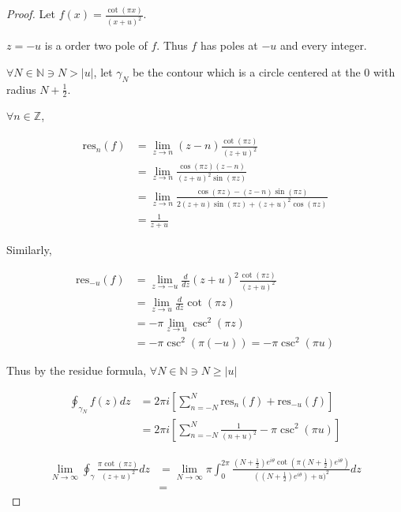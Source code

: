 \documentclass{article}
\newcommand{\Z}{\mathbb{Z}}
\newcommand{\N}{\mathbb{N}}
\begin{document}
\begin{proof}
    Let $f(x) = \frac{\cot(\pi x)}{(x + u)^2}$.
    
    $z = -u$ is a order two pole of $f$. Thus $f$ has poles at $-u$ and every integer.
    
    
    $\forall N \in \N \ni N > |u|$, let $\gamma_N$ be the contour which is a circle centered at the $0$ with radius $N + \frac{1}{2}$.    
    

    $\forall n \in \Z$, 

    \begin{align*}
        \text{res}_{n}(f) &= \lim_{z \to n} (z - n) \frac{\cot(\pi z)}{(z + u)^2} \\
        &= \lim_{z \to n} \frac{\cos(\pi z) (z - n)}{(z + u)^2 \sin(\pi z)} \\
        &= \lim_{z \to n} \frac{\cos(\pi z) - (z - n) \sin(\pi z)}{2(z + u) \sin(\pi z) + (z + u)^2 \cos(\pi z)} \\
        &= \frac{1}{z + u}
    \end{align*}

    Similarly,

    \begin{align*}
        \text{res}_{-u}(f) &= \lim_{z \to -u} \frac{d}{dz}(z + u)^2 \frac{\cot(\pi z)}{(z + u)^2} \\
        &= \lim_{z \to u} \frac{d}{dz} \cot(\pi z) \\
        &= - \pi \lim_{z \to u} \csc^2(\pi z) \\
        &= -\pi \csc^2(\pi (-u)) =  -\pi \csc^2(\pi u)
    \end{align*}

    Thus by the residue formula, $\forall N \in \N \ni N \geq |u|$  

    \begin{align*}
        \oint_{\gamma_N} f(z) dz &= 2 \pi i \left[\sum_{n = -N}^{N} \text{res}_{n}(f) + \text{res}_{-u}(f)\right] \\
        &= 2 \pi i \left[\sum_{n = -N}^{N} \frac{1}{(n + u)^2} -\pi \csc^2(\pi u)\right]
    \end{align*}


    \begin{align*}
        \lim_{N \to \infty} \oint_\gamma \frac{\pi\cot(\pi z)}{(z + u)^2} dz &= \lim_{N \to \infty}  \pi \int_{0}^{2 \pi} \frac{(N + \frac{1}{2})e^{i \theta} \cot(\pi (N + \frac{1}{2})e^{i \theta})}{((N + \frac{1}{2})e^{i \theta}) + u)^2} dz \\
        &= 
    \end{align*}


\end{proof}
\end{document}
